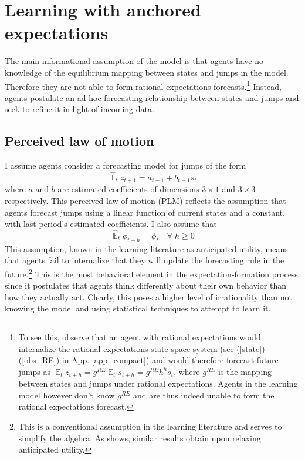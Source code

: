 \documentclass[11pt]{article}
\renewcommand{\[}{\begin{equation}}
\renewcommand{\]}{\end{equation}}
\DeclareMathOperator{\E}{\mathbb{E}}
\begin{document}
\section{Learning with anchored expectations}\label{learning}
The main informational assumption of the model is that agents have no knowledge of the equilibrium mapping between states and jumps in the model. Therefore they are not able to form rational expectations forecasts.\footnote{To see this, observe that an agent with rational expectations would internalize the rational expectations state-space system (see (\ref{state}) - (\ref{obs_RE}) in App. \ref{app_compact}) and would therefore forecast future jumps as $\E_t z_{t+h} = g^{RE}\E_ts_{t+h} = g^{RE}h^{h}s_t$, where $g^{RE}$ is the mapping between states and jumps under rational expectations. Agents in the learning model however don't know $g^{RE}$ and are thus indeed unable to form the rational expectations forecast.} Instead, agents postulate an ad-hoc forecasting relationship between states and jumps and seek to refine it in light of incoming data. 
\subsection{Perceived law of motion}
I assume agents consider a forecasting model for jumps of the form
\begin{equation}
\hat{\E}_{t}z_{t+1} = a_{t-1} + b_{t-1} s_{t} \label{PLM}  
\end{equation}
where $a$ and $b$ are estimated coefficients of dimensions $3\times1$ and $3\times3$ respectively. This perceived law of motion (PLM) reflects the assumption that agents forecast jumps using a linear function of current states and a constant, with last period's estimated coefficients. I also assume that 
\begin{equation}
\hat{\E}_{t}{\phi_{t+h}} = \phi_{t} \quad \forall \; h\geq0 
\end{equation}
This assumption, known in the learning literature as anticipated utility, means that agents fail to internalize that they will update the forecasting rule in the future.\footnote{This is a conventional assumption in the learning literature and serves to simplify the algebra. As \cite{sargent1999} shows, similar results obtain upon relaxing anticipated utility.} This is the most behavioral element in the expectation-formation process since it postulates that agents think differently about their own behavior than how they actually act. Clearly, this poses a higher level of irrationality than not knowing the model and using statistical techniques to attempt to learn it.
\end{document}
